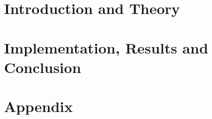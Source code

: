 \documentclass[11pt,a4paper,bibtotoc,idxtotoc,headsepline,footsepline,footexclude,BCOR12mm,DIV13]{scrbook}
\begin{document}
	\frontmatter
	
	
	
	
	
	
	
	
	
	
	

	\tableofcontents
	
  
  

	\mainmatter
	
	
		\part[Part One: Introduction and Theory]{Introduction and Theory}
		\label{firstpart}
		
		
		
		
		
		
		
		
		\part[Part Two: Implementation, Results and Conclusion]{Implementation, Results and Conclusion}
		\label{secondpart}
		
		
		
		
		
		
		\part*{Appendix}
		
		\appendix %
		
		
		
	


  \clearemptydoublepage
  
	
	
	
 
\end{document}
